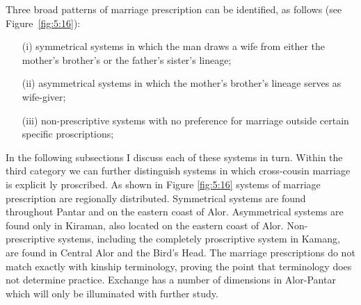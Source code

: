 Three broad patterns of marriage prescription can be identified, as follows (see Figure~\ref{fig:5:16}): 
\begin{enumerate}
\item[(i)] symmetrical systems in which the man draws a wife from either the mother's brother's or the father's sister's lineage; 
\item[(ii)] asymmetrical systems in which the mother's brother's lineage serves as wife-giver; 
\item[(iii)] non-prescriptive systems with no preference for marriage outside certain specific proscriptions;
\end{enumerate}

In the following subsections I discuss each of these systems in turn. Within the third category we can further distinguish systems in which cross-cousin marriage is explicit	ly proscribed. As shown in Figure \ref{fig:5:16} systems of marriage prescription are regionally distributed. Symmetrical systems are found throughout Pantar and on the eastern coast of Alor. Asymmetrical systems are found only in Kiraman, also located on the eastern coast of Alor. Non-prescriptive systems, including the completely proscriptive system in Kamang, are found in Central Alor and the Bird's Head. The marriage prescriptions do not match exactly with kinship terminology, proving the point that  terminology does not determine practice. Exchange has a number of dimensions in Alor-Pantar which will only be illuminated with further study.

